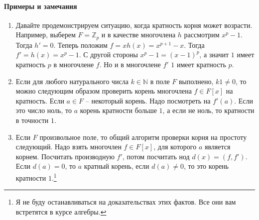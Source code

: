 \paragraph{Примеры и замечания}
\begin{enumerate}
\item
Давайте продемонстрируем ситуацию, когда кратность корня может возрасти. Например, выберем $F = \mathbb Z_p$ и в качестве многочлена $h$ рассмотрим $x^p - 1$. Тогда $h' = 0$. Теперь положим $f = xh(x) = x^{p+1}- x$. Тогда $f' = h(x) = x^p - 1$. С другой стороны $x^p - 1 = (x-1)^p$, а значит $1$ имеет кратность $p$ в многочлене $f$. Но и в многочлене $f'$ $1$ имеет кратность $p$.

\item Если для любого натурального числа $k\in \mathbb N$ в поле $F$ выполнено, $k 1 \neq 0$, то можно следующим образом проверить корень многочлена $f\in F[x]$ на кратность. Если $a\in F$ -- некоторый корень. Надо посмотреть на $f'(a)$. Если это число ноль, то $a$ корень кратности больше $1$, а если не ноль, то кратности в точности $1$.

\item Если $F$ произвольное поле, то общий алгоритм проверки корня на простоту следующий. Надо взять многочлен $f\in F[x]$, для которого $a$ является корнем. Посчитать производную $f'$, потом посчитать нод $d(x) = (f, f')$. Если $d(a) = 0$, то $a$ кратный корень, если $d(a) \neq 0$, то это корень кратности $1$.\footnote{Я не буду останавливаться на доказательствах этих фактов. Все они вам встретятся в курсе алгебры.}
\end{enumerate}